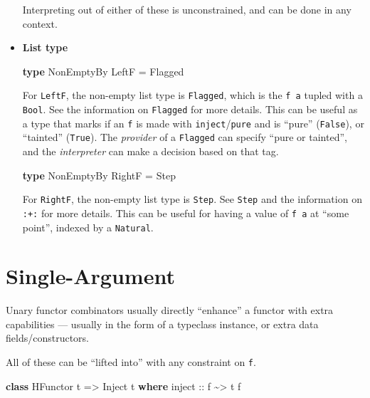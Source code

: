 \documentclass[]{article}
\newenvironment{Shaded}{}{}
\newcommand{\DataTypeTok}[1]{\textcolor[rgb]{0.56,0.13,0.00}{#1}}
\newcommand{\KeywordTok}[1]{\textcolor[rgb]{0.00,0.44,0.13}{\textbf{#1}}}
\newcommand{\NormalTok}[1]{#1}
\newcommand{\OperatorTok}[1]{\textcolor[rgb]{0.40,0.40,0.40}{#1}}
\newcommand{\OtherTok}[1]{\textcolor[rgb]{0.00,0.44,0.13}{#1}}
\begin{document}
\begin{itemize}
  Interpreting out of either of these is unconstrained, and can be done in any
  context.
\item
  \textbf{List type}

\begin{Shaded}
\begin{Highlighting}[]
\KeywordTok{type} \DataTypeTok{NonEmptyBy} \DataTypeTok{LeftF} \OtherTok{=} \DataTypeTok{Flagged}
\end{Highlighting}
\end{Shaded}

  For \texttt{LeftF}, the non-empty list type is \texttt{Flagged}, which is the
  \texttt{f\ a} tupled with a \texttt{Bool}. See the information on
  \texttt{Flagged} for more details. This can be useful as a type that marks if
  an \texttt{f} is made with \texttt{inject}/\texttt{pure} and is ``pure''
  (\texttt{False}), or ``tainted'' (\texttt{True}). The \emph{provider} of a
  \texttt{Flagged} can specify ``pure or tainted'', and the \emph{interpreter}
  can make a decision based on that tag.

\begin{Shaded}
\begin{Highlighting}[]
\KeywordTok{type} \DataTypeTok{NonEmptyBy} \DataTypeTok{RightF} \OtherTok{=} \DataTypeTok{Step}
\end{Highlighting}
\end{Shaded}

  For \texttt{RightF}, the non-empty list type is \texttt{Step}. See
  \texttt{Step} and the information on \texttt{:+:} for more details. This can
  be useful for having a value of \texttt{f\ a} at ``some point'', indexed by a
  \texttt{Natural}.
\end{itemize}

\hypertarget{single-argument}{%
\section{Single-Argument}\label{single-argument}}

Unary functor combinators usually directly ``enhance'' a functor with extra
capabilities --- usually in the form of a typeclass instance, or extra data
fields/constructors.

All of these can be ``lifted into'' with any constraint on \texttt{f}.

\begin{Shaded}
\begin{Highlighting}[]
\KeywordTok{class} \DataTypeTok{HFunctor}\NormalTok{ t }\OtherTok{=>} \DataTypeTok{Inject}\NormalTok{ t }\KeywordTok{where}
\OtherTok{    inject ::}\NormalTok{ f }\OperatorTok{\textasciitilde{}>}\NormalTok{ t f}
\end{Highlighting}
\end{Shaded}
\end{document}
